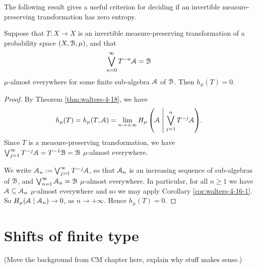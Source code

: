 The following result gives a useful criterion for deciding if an invertible measure-preserving transformation has zero entropy.

\begin{corollary}
	Suppose that $T : X \to X$ is an invertible measure-preserving transformation of a probability space $(X, \mathcal{B}, \mu)$, and that
	\[
		\bigvee_{n = 0}^\infty{T^{-n}{\mathcal{A}}} = \mathcal{B}
	\]
	$\mu$-almost everywhere for some finite sub-algebra $\mathcal{A}$ of $\mathcal{B}$. Then $h_\mu(T) = 0$.
	
	\begin{proof}
		By Theorem \ref{thm:walters-4-18}, we have
		\[
			h_\mu(T) = h_\mu(T, \mathcal{A}) = \lim_{n \to +\infty}{H_\mu\left(\mathcal{A} \mathrel{}\middle|\mathrel{} \bigvee_{j = 1}^n{T^{-j}{\mathcal{A}}}\right)}.
		\]
		Since $T$ is a measure-preserving transformation, we have $\bigvee_{j = 1}^\infty{T^{-j}{\mathcal{A}}} = T^{-1}{\mathcal{B}} = \mathcal{B}$ $\mu$-almost everywhere.
		
		We write $\mathcal{A}_n := \bigvee_{j = 1}^\infty{T^{-j}{\mathcal{A}}}$, so that $\mathcal{A}_n$ is an increasing sequence of sub-algebras of $\mathcal{B}$, and $\bigvee_{n = 1}^\infty{\mathcal{A}_n} = \mathcal{B}$ $\mu$-almost everywhere. In particular, for all $n \geq 1$ we have $\mathcal{A} \subseteq \mathcal{A}_n$ $\mu$-almost everywhere and so we may apply Corollary \ref{cor:walters-4-16-1}. So $H_\mu(\mathcal{A} \mid \mathcal{A}_n) \to 0$, as $n \to +\infty$. Hence $h_\mu(T) = 0$.
	\end{proof}
\end{corollary}

\section{Shifts of finite type}
(Move the background from CM chapter here, explain why stuff makes sense.)
